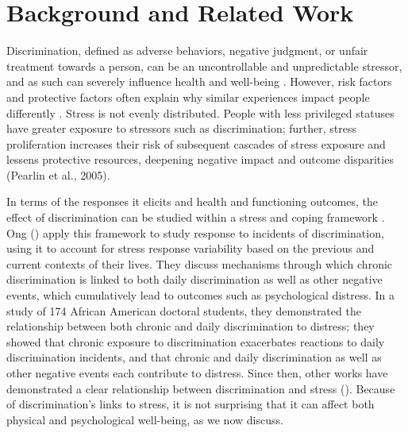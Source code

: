 \section{Background and Related Work}
\label{sec:back}

\label{sec:back-discrimination}
\noindent 
Discrimination, defined as adverse behaviors, negative judgment, or unfair treatment towards a person, can be an uncontrollable and unpredictable stressor, and as such can severely influence health and well-being \citep{Williams:2009}. However, risk factors and protective factors often explain why similar experiences impact people differently \citep{SeridoAlmeidaWethington:2004}.  Stress is not evenly distributed. People with less privileged statuses have  greater exposure to stressors such as discrimination; further, stress proliferation increases their risk of subsequent cascades of stress exposure and  lessens protective resources, deepening negative impact and outcome disparities (Pearlin et al., 2005).

In terms of the responses it elicits and  health and functioning outcomes, the effect of discrimination can be studied within a stress and coping framework \citep{Pearlin:1999}. Ong \etal (\citeyear{Ong:2009}) apply this framework to  study  response to incidents of discrimination, using it to account for stress response variability based on the previous and current contexts of their lives. They discuss mechanisms through which chronic discrimination is linked to both daily discrimination as well as other negative events, which cumulatively lead to outcomes such as psychological distress. In a  study of  174 African American doctoral students, they demonstrated the relationship between both chronic and daily discrimination to distress; they showed that chronic exposure to discrimination exacerbates reactions to daily discrimination incidents, and that chronic and daily discrimination as well as other negative events each contribute to distress. Since then, other works have demonstrated a clear relationship between discrimination and stress (\eg \cite{Pieterse:2007}).  
Because of discrimination's links to stress, it is not surprising that it can affect both physical and psychological well-being, as we now discuss.

